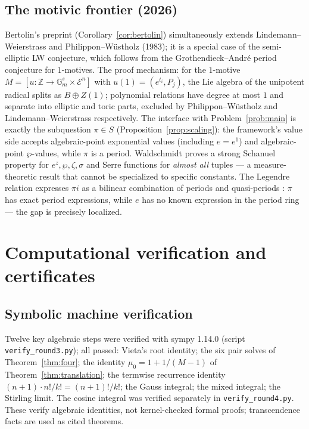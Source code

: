 \documentclass[11pt]{amsart}
\theoremstyle{definition}
\theoremstyle{remark}
\numberwithin{equation}{section}
\newcommand{\Z}{\mathbb{Z}}
\newcommand{\irr}{\mu}
\newcommand{\ee}{e}
\begin{document}
\subsection{The motivic frontier (2026)}

Bertolin's preprint \cite{Bertolin2026} (Corollary~\ref{cor:bertolin}) simultaneously extends Lindemann--Weierstrass and Philippon--W\"ustholz (1983); it is a special case of the semi-elliptic LW conjecture, which follows from the Grothendieck--André period conjecture for $1$-motives. The proof mechanism: for the $1$-motive $M=[u:\Z\to\mathbb G_m^s\times\mathcal E^n]$ with $u(1)=(\ee^{t_i},P_j)$, the Lie algebra of the unipotent radical splits as $B\oplus Z(1)$; polynomial relations have degree at most $1$ and separate into elliptic and toric parts, excluded by Philippon--W\"ustholz and Lindemann--Weierstrass respectively. The interface with Problem~\ref{prob:main} is exactly the subquestion $\pi\in S$ (Proposition~\ref{prop:scaling}): the framework's value side accepts algebraic-point exponential values (including $\ee=\ee^1$) and algebraic-point $\wp$-values, while $\pi$ is a period. Waldschmidt \cite{Waldschmidt2025} proves a strong Schanuel property for $\ee^z,\wp,\zeta,\sigma$ and Serre functions for \emph{almost all} tuples --- a measure-theoretic result that cannot be specialized to specific constants. The Legendre relation expresses $\pi i$ as a bilinear combination of periods and quasi-periods \cite{DLMF23}: $\pi$ has exact period expressions, while $\ee$ has no known expression in the period ring --- the gap is precisely localized.

\section{Computational verification and certificates}\label{sec:computation}

\subsection{Symbolic machine verification}

Twelve key algebraic steps were verified with sympy 1.14.0 (script \texttt{verify\_round3.py}); all passed: Vieta's root identity; the six pair solves of Theorem~\ref{thm:four}; the identity $\irr_0=1+1/(M-1)$ of Theorem~\ref{thm:translation}; the termwise recurrence identity $(n+1)\cdot n!/k!=(n+1)!/k!$; the Gauss integral; the mixed integral; the Stirling limit. The cosine integral was verified separately in \texttt{verify\_round4.py}. These verify algebraic identities, not kernel-checked formal proofs; transcendence facts are used as cited theorems.
\end{document}
